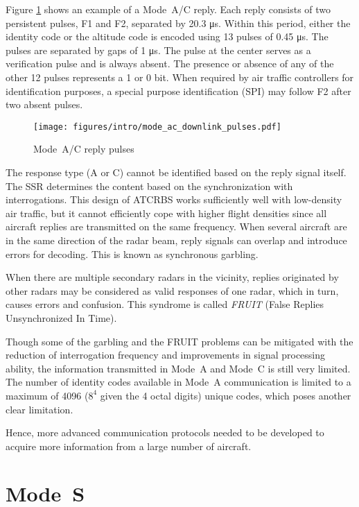 Figure \ref{fig:mode_ac_downlink_pulses} shows an example of a Mode~A/C reply. Each reply consists of two persistent pulses, F1 and F2, separated by 20.3 μs. Within this period, either the identity code or the altitude code is encoded using 13 pulses of 0.45 μs. The pulses are separated by gaps of 1 μs. The pulse at the center serves as a verification pulse and is always absent. The presence or absence of any of the other 12 pulses represents a 1 or 0 bit. When required by air traffic controllers for identification purposes, a special purpose identification (SPI) may follow F2 after two absent pulses.

\begin{figure}[ht]
  \texttt{[image: figures/intro/mode\_ac\_downlink\_pulses.pdf]}
  \caption{Mode~A/C reply pulses}
  \label{fig:mode_ac_downlink_pulses}
\end{figure}

The response type (A or C) cannot be identified based on the reply signal itself. The SSR determines the content based on the synchronization with interrogations. This design of ATCRBS works sufficiently well with low-density air traffic, but it cannot efficiently cope with higher flight densities since all aircraft replies are transmitted on the same frequency. When several aircraft are in the same direction of the radar beam, reply signals can overlap and introduce errors for decoding. This is known as synchronous garbling.

When there are multiple secondary radars in the vicinity, replies originated by other radars may be considered as valid responses of one radar, which in turn, causes errors and confusion. This syndrome is called \emph{FRUIT} (False Replies Unsynchronized In Time).

Though some of the garbling and the FRUIT problems can be mitigated with the reduction of interrogation frequency and improvements in signal processing ability, the information transmitted in Mode~A and Mode~C is still very limited. The number of identity codes available in Mode~A communication is limited to a maximum of 4096 ($8^4$ given the 4 octal digits) unique codes, which poses another clear limitation.

Hence, more advanced communication protocols needed to be developed to acquire more information from a large number of aircraft.



\section{Mode~S}

